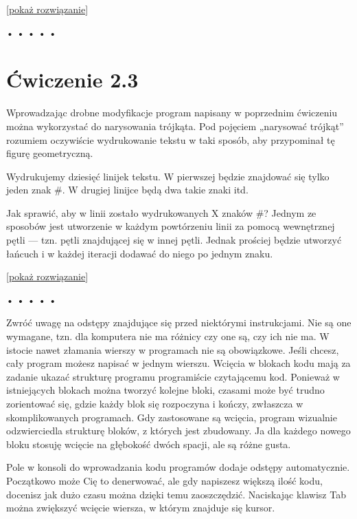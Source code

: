 [\hyperref[sol:2.2]{pokaż rozwiązanie}]
  
\begin{center}
• • • • •
\end{center}
  
\section*{Ćwiczenie 2.3}
\label{sec:2.3}
      
Wprowadzając drobne modyfikacje program napisany w poprzednim ćwiczeniu można wykorzystać do narysowania trójkąta. Pod pojęciem „narysować trójkąt” rozumiem oczywiście wydrukowanie tekstu w taki sposób, aby przypominał tę figurę geometryczną.

      
Wydrukujemy dziesięć linijek tekstu. W pierwszej będzie znajdować się tylko jeden znak \#. W drugiej linijce będą dwa takie znaki itd.

      
Jak sprawić, aby w linii zostało wydrukowanych X znaków \#? Jednym ze sposobów jest utworzenie w każdym powtórzeniu linii za pomocą wewnętrznej pętli — tzn. pętli znajdującej się w innej pętli. Jednak prościej będzie utworzyć łańcuch i w każdej iteracji dodawać do niego po jednym znaku.

    
[\hyperref[sol:2.3]{pokaż rozwiązanie}]
    
  
\begin{center}
• • • • •
\end{center}
  
    
Zwróć uwagę na odstępy znajdujące się przed niektórymi instrukcjami. Nie są one wymagane, tzn. dla komputera nie ma różnicy czy one są, czy ich nie ma. W istocie nawet złamania wierszy w programach nie są obowiązkowe. Jeśli chcesz, cały program możesz napisać w jednym wierszu. Wcięcia w blokach kodu mają za zadanie ukazać strukturę programu programiście czytającemu kod. Ponieważ w istniejących blokach można tworzyć kolejne bloki, czasami może być trudno zorientować się, gdzie każdy blok się rozpoczyna i kończy, zwłaszcza w skomplikowanych programach. Gdy zastosowane są wcięcia, program wizualnie odzwierciedla strukturę bloków, z których jest zbudowany. Ja dla każdego nowego bloku stosuję wcięcie na głębokość dwóch spacji, ale są różne gusta.

    
Pole w konsoli do wprowadzania kodu programów dodaje odstępy automatycznie. Początkowo może Cię to denerwować, ale gdy napiszesz większą ilość kodu, docenisz jak dużo czasu można dzięki temu zaoszczędzić. Naciskając klawisz Tab można zwiększyć wcięcie wiersza, w którym znajduje się kursor.

